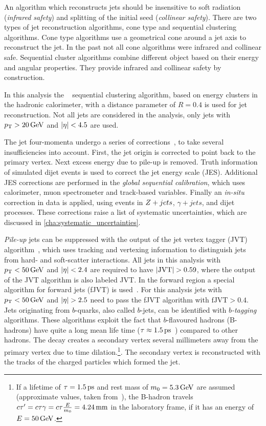 An algorithm which reconstructs jets should be insensitive to soft radiation (\emph{infrared safety})
and splitting of the initial seed (\emph{collinear safety}).
There are two types of jet reconstruction algorithms, cone type and sequential clustering algorithms.
Cone type algorithms use a geometrical cone around a jet axis to reconstruct the jet. In the past not
all cone algorithms were infrared and collinear safe.
Sequential cluster algorithms combine different object based on their energy and angular properties.
They provide infrared and collinear safety by construction.

In this analysis the \antikt{}~\cite{Cacciari:2008gp,Cacciari:2005hq} sequential clustering algorithm, based on energy clusters in the
hadronic calorimeter, with a distance parameter of $R = 0.4$ is used for jet reconstruction.
Not all jets are considered in the analysis, only jets with $\pt > \unit[20]{GeV}$ and $\left|\eta\right| < 4.5$ are used.

The jet four-momenta undergo a series of corrections~\cite{PERF-2016-04}, to take several insufficiencies into account.
First, the jet origin is corrected to point back to the primary vertex. Next excess energy due to pile-up is removed.
Truth information of simulated dijet events is used to correct the jet energy scale (JES).
Additional JES corrections are performed in the \emph{global sequential calibration}, which uses calorimeter, muon
spectrometer and track-based variables. Finally an \emph{in-situ} correction in data is applied, using events
in $Z+jets$, $\gamma + jets$, and dijet processes.
These corrections raise a list of systematic uncertainties, which are discussed in \cref{cha:systematic_uncertainties}.

\emph{Pile-up} jets can be suppressed with the output of the jet vertex tagger (JVT) algorithm~\cite{PERF-2014-03}, which
uses tracking and vertexing information to distinguish jets from hard- and soft-scatter interactions.
All jets in this analysis with $\pt < \unit[50]{GeV}$ and $\left|\eta\right| < 2.4$ are required to have $\left|\text{JVT}\right| > 0.59$, where the output of the
JVT algorithm is also labeled JVT\@.
In the forward region a special algorithm for forward jets (fJVT) is used~\cite{ATL-PHYS-PUB-2015-034}.
For this analysis jets with $\pt < \unit[50]{GeV}$ and $\left|\eta\right| > 2.5$ need to pass the fJVT algorithm with
$\text{fJVT} > 0.4$.
\\[\baselineskip]
Jets originating from $b$-quarks, also called $b$-jets, can be identified with \emph{$b$-tagging} algorithms.
These algorithms exploit the fact that $b$-flavoured hadrons (B-hadrons) have quite a long mean life time
($\tau \approx \unit[1.5]{ps}$~\cite{PDG}) compared to other hadrons.
The decay creates a secondary vertex several millimeters away from the primary vertex due to time
dilation.\footnote{If a lifetime of $\tau = \unit[1.5]{ps}$ and rest mass of $m_0 = \unit[5.3]{GeV}$ are assumed (approximate values, taken from~\cite{PDG}),
the B-hadron travels $c\tau' = c \tau \gamma = c \tau \frac{E}{m_0} = \unit[4.24]{mm}$ in the laboratory frame, if it has an energy of $E = \unit[50]{GeV}$.}.
The secondary vertex is reconstructed with the tracks of the charged particles which formed the jet.


